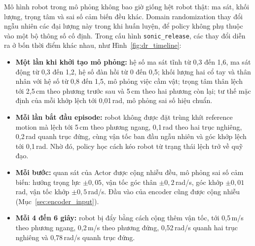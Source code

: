\documentclass[12pt,a4paper,oneside]{report}
\newcommand{\code}[1]{\texttt{#1}}
\begin{document}
Mô hình robot trong mô phỏng không bao giờ giống hệt robot thật: ma sát, khối lượng, trọng tâm và sai số cảm biến đều khác. Domain randomization thay đổi ngẫu nhiên các đại lượng này trong khi huấn luyện, để policy không phụ thuộc vào một bộ thông số cố định. Trong cấu hình \code{sonic\_release}, các thay đổi diễn ra ở bốn thời điểm khác nhau, như Hình~\ref{fig:dr_timeline}:
\begin{itemize}
\item \textbf{Một lần khi khởi tạo mô phỏng:} hệ số ma sát tĩnh từ 0,3 đến 1,6, ma sát động từ 0,3 đến 1,2, hệ số đàn hồi từ 0 đến 0,5; khối lượng hai cổ tay và thân nhân với hệ số từ 0,8 đến 1,5, mô phỏng việc cầm vật; trọng tâm thân lệch tới 2,5\,cm theo phương trước sau và 5\,cm theo hai phương còn lại; tư thế mặc định của mỗi khớp lệch tới 0,01\,rad, mô phỏng sai số hiệu chuẩn.
\item \textbf{Mỗi lần bắt đầu episode:} robot không được đặt trùng khít reference motion mà lệch tới 5\,cm theo phương ngang, 0,1\,rad theo hai trục nghiêng, 0,2\,rad quanh trục đứng, cùng vận tốc ban đầu ngẫu nhiên và góc khớp lệch tới 0,1\,rad. Nhờ đó, policy học cách kéo robot từ trạng thái lệch trở về quỹ đạo.
\item \textbf{Mỗi bước:} quan sát của Actor được cộng nhiễu đều, mô phỏng sai số cảm biến: hướng trọng lực $\pm 0{,}05$, vận tốc góc thân $\pm 0{,}2$\,rad/s, góc khớp $\pm 0{,}01$\,rad, vận tốc khớp $\pm 0{,}5$\,rad/s. Đầu vào của encoder cũng được cộng nhiễu (Mục~\ref{sec:encoder_input}).
\item \textbf{Mỗi 4 đến 6 giây:} robot bị đẩy bằng cách cộng thêm vận tốc, tới 0,5\,m/s theo phương ngang, 0,2\,m/s theo phương đứng, 0,52\,rad/s quanh hai trục nghiêng và 0,78\,rad/s quanh trục đứng.
\end{itemize}
\end{document}
